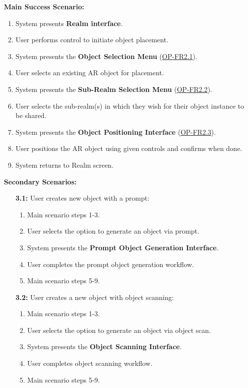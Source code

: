 \documentclass{article}
\begin{document}
\begin{enumerate}[label=\textbf{UC\arabic*}]
        \textbf{Main Success Scenario:}
        \begin{enumerate}[label=\textbf{\arabic*.}]
            \item System presents \textbf{Realm interface}.
            \item User performs control to initiate object placement.
            \item System presents the \textbf{Object Selection Menu} (\hyperref[ssub:object_placement]{OP-FR2.1}).
            \item User selects an existing AR object for placement.
            \item System presents the \textbf{Sub-Realm Selection Menu} (\hyperref[ssub:object_placement]{OP-FR2.2}).
            \item User selects the sub-realm(s) in which they wish for their object instance to be shared.
            \item System presents the \textbf{Object Positioning Interface} (\hyperref[ssub:object_placement]{OP-FR2.3}). 
            \item User positions the AR object using given controls and confirms when done.
            \item System returns to Realm screen.
        \end{enumerate}
    
        \textbf{Secondary Scenarios:}
        \begin{itemize}
            \item[{\bf 3.1:}] User creates new object with a prompt:
            \begin{enumerate}[label=\textbf{\arabic*.}]
                \item Main scenario steps 1-3.
                \item User selects the option to generate an object via prompt.
                \item System presents the \textbf{Prompt Object Generation Interface}.
                \item User completes the prompt object generation workflow.
                \item Main scenario steps 5-9.
            \end{enumerate}
    
            \item[{\bf 3.2:}] User creates a new object with object scanning:
            \begin{enumerate}[label=\textbf{\arabic*.}]
                \item Main scenario steps 1-3.
                \item User selects the option to generate an object via object scan.
                \item System presents the \textbf{Object Scanning Interface}.
                \item User completes object scanning workflow.
                \item Main scenario steps 5-9.
            \end{enumerate}
    

\end{itemize}
\end{enumerate}
\end{document}

